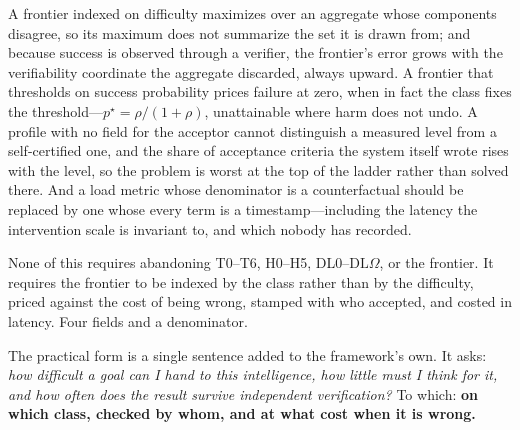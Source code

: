 \documentclass[11pt]{article}
\theoremstyle{definition}
\newcommand{\pstar}{\ensuremath{p^{\star}}}
\newcommand{\DLO}{\ensuremath{\mathrm{DL}\Omega}}
\begin{document}
A frontier indexed on difficulty maximizes over an aggregate whose components disagree, so its maximum does not summarize the set it is drawn from; and because success is observed through a verifier, the frontier's error grows with the verifiability coordinate the aggregate discarded, always upward. A frontier that thresholds on success probability prices failure at zero, when in fact the class fixes the threshold---$\pstar=\rho/(1+\rho)$, unattainable where harm does not undo. A profile with no field for the acceptor cannot distinguish a measured level from a self-certified one, and the share of acceptance criteria the system itself wrote rises with the level, so the problem is worst at the top of the ladder rather than solved there. And a load metric whose denominator is a counterfactual should be replaced by one whose every term is a timestamp---including the latency the intervention scale is invariant to, and which nobody has recorded.

None of this requires abandoning T0--T6, H0--H5, DL0--\DLO{}, or the frontier. It requires the frontier to be indexed by the class rather than by the difficulty, priced against the cost of being wrong, stamped with who accepted, and costed in latency. Four fields and a denominator.

The practical form is a single sentence added to the framework's own. It asks: \emph{how difficult a goal can I hand to this intelligence, how little must I think for it, and how often does the result survive independent verification?} To which: \textbf{on which class, checked by whom, and at what cost when it is wrong.}



\end{document}
